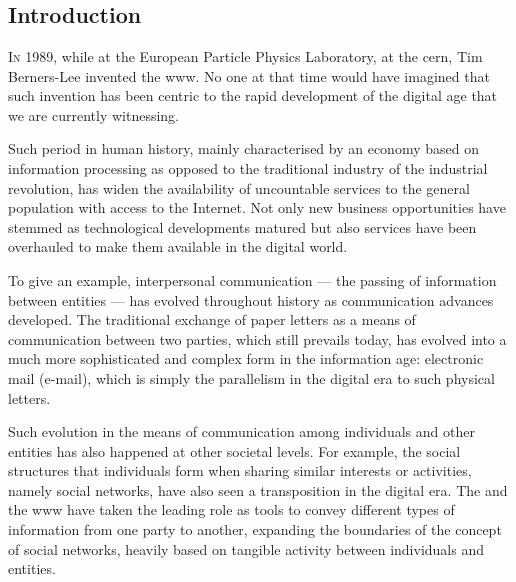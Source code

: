 \documentclass[showtrims,oldfontcommands]{kthesis}
\begin{document}
\mainmatter

\part*{}

\chapter{Introduction}
    \label{chapter:introduction}

    
\lettrine{\textcolor[gray]{.25}{I}}{n} 1989, while at the European Particle Physics 
Laboratory, at the \acf{cern}, Tim Berners-Lee invented the \Ac{www}. No one at that 
time would have imagined that such invention has been centric to the rapid development 
of the digital age that we are currently witnessing.

Such period in human history, mainly characterised by an economy based on information 
processing as opposed to the traditional industry of the industrial revolution, 
has widen the availability of uncountable services to the general population with 
access to the Internet. Not only new business opportunities have stemmed as technological 
developments matured but also services have been overhauled to make them available 
in the digital world.

To give an example, interpersonal communication --- the passing of information between 
entities --- has evolved throughout history as communication advances developed. 
The traditional exchange of paper letters as a means of communication between two 
parties, which still prevails today, has evolved into a much more sophisticated 
and complex form in the information age: electronic mail (e-mail), which is simply 
the parallelism in the digital era to such physical letters.

Such evolution in the means of communication among individuals and other entities 
has also happened at other societal levels. For example, the social structures that 
individuals form when sharing similar interests or activities, namely social networks, 
have also seen a transposition in the digital era. The \Internet and the \ac{www} 
have taken the leading role as tools to convey different types of information from 
one party to another, expanding the boundaries of the concept of social networks, 
heavily based on tangible activity between individuals and entities.
\end{document}

